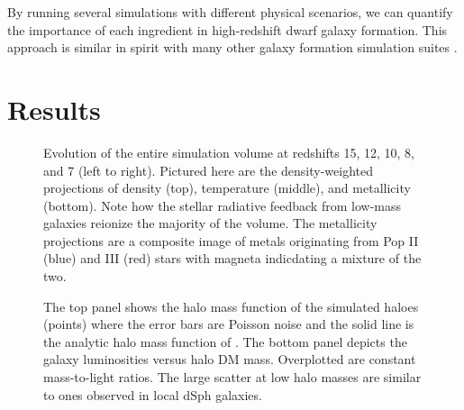 \documentclass[useAMS,usenatbib]{mn2e}
\begin{document}
By running several simulations with different physical scenarios, we
can quantify the importance of each ingredient in high-redshift dwarf
galaxy formation.  This approach is similar in spirit with many other
galaxy formation simulation suites \citep[e.g.][]{Schaye10,
  Maio10_Pop32}.

\section{Results}
\label{sec:results}

\begin{figure*}
  \caption{\label{fig:evo-mosaic} Evolution of the entire simulation
    volume at redshifts 15, 12, 10, 8, and 7 (left to right).
    Pictured here are the density-weighted projections of density
    (top), temperature (middle), and metallicity (bottom).  Note how
    the stellar radiative feedback from low-mass galaxies reionize
    the majority of the volume.  The metallicity projections are a
    composite image of metals originating from Pop II (blue) and III
    (red) stars with magneta indicdating a mixture of the two.}
\end{figure*}

\begin{figure}
  \caption{\label{fig:mass_fn} The top panel shows the halo mass
    function of the simulated haloes (points) where the error bars are
    Poisson noise and the solid line is the analytic halo mass
    function of \citet{Warren06}.  The bottom panel depicts the galaxy
    luminosities versus halo DM mass.  Overplotted are constant
    mass-to-light ratios.  The large scatter at low halo masses are
    similar to ones observed in local dSph galaxies.}
\end{figure}


\end{document}
